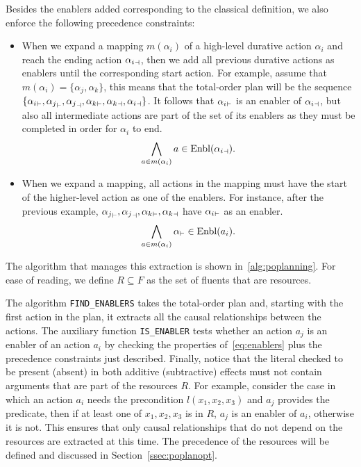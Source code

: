 Besides the enablers added corresponding to the classical definition, we also enforce the following precedence constraints:
\begin{itemize}
    \item When we expand a mapping $m(\alpha_i)$ of a high-level durative action $\alpha_i$ and reach the ending action $\aEnd{\alpha_i}$, then we add all previous durative actions as enablers until the corresponding start action. For example, assume that $m(\alpha_i)=\{\alpha_j, \alpha_k\}$, this means that the total-order plan will be the sequence $\{\aStart{\alpha_i}, \aStart{\alpha_j}, \aEnd{\alpha_j}, \aStart{\alpha_k}, \aEnd{\alpha_k}, \aEnd{\alpha_i}\}$. It follows that $\aStart{\alpha_i}$ is an enabler of $\aEnd{\alpha_i}$, but also all intermediate actions are part of the set of its enablers as they must be completed in order for $\alpha_i$ to end.
    \begin{equation}
        \bigwedge_{a\in m(\alpha_i)} a\in \ach{\aEnd{\alpha_i}}.
        \label{eq:constraint5}
    \end{equation}
    \item When we expand a mapping, all actions in the mapping must have the start of the higher-level action as one of the enablers. For instance, after the previous example, $\aStart{\alpha_j}, \aEnd{\alpha_j}, \aStart{\alpha_k}, \aEnd{\alpha_k}$ have $\aStart{\alpha_i}$ as an enabler.
    \begin{equation}
        \bigwedge_{a\in m(\alpha_i)} \aStart{\alpha} \in \ach{a_i}.
        \label{eq:constraint4}
    \end{equation}
\end{itemize}


The algorithm that manages this extraction is shown in~\autoref{alg:poplanning}. For ease of reading, we define $R\subseteq F$ as the set of fluents that are resources.

The algorithm \texttt{FIND\_ENABLERS} takes the total-order plan and, starting with the first action in the plan, it extracts all the causal relationships between the actions. The auxiliary function \texttt{IS\_ENABLER} tests whether an action $a_j$ is an enabler of an action $a_i$ by checking the properties of~\autoref{eq:enablers} plus the precedence constraints just described. Finally, notice that the literal checked to be present (absent) in both additive (subtractive) effects must not contain arguments that are part of the resources $R$. For example, consider the case in which an action $a_i$ needs the precondition $l(x_1, x_2, x_3)$ and $a_j$ provides the predicate, then if at least one of $x_1, x_2, x_3$ is in $R$, $a_j$ is an enabler of $a_i$, otherwise it is not. This ensures that only causal relationships that do not depend on the resources are extracted at this time. The precedence of the resources will be defined and discussed in Section~\ref{ssec:poplanopt}. 

